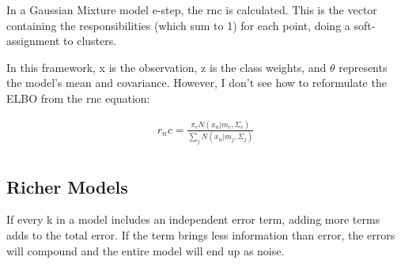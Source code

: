 \documentclass[11pt]{article}
\begin{document}
In a Gaussian Mixture model e-step, the rnc is calculated. This is the vector containing the responsibilities (which sum to 1) for each point, doing a soft-assignment to clusters.

In this framework, x is the observation, z is the class weights, and $\theta$ represents the model's mean and covariance. However, I don't see how to reformulate the ELBO from the rnc equation:

\begin{align}
	r_nc = \frac{\pi_cN(x_n|m_c,\Sigma_c)}{\sum_{j}N(x_n|m_j,\Sigma_j)} \\
\end{align}

\subsection{Richer Models}

If every k in a model includes an independent error term, adding more terms adds to the total error. If the term brings less information than error, the errors will compound and the entire model will end up as noise.
\end{document}

